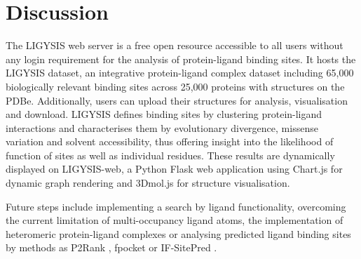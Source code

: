 \section{Discussion}

The LIGYSIS web server is a free open resource accessible to all users without any login requirement for the analysis of protein-ligand binding sites. It hosts the LIGYSIS dataset, an integrative protein-ligand complex dataset including 65,000 biologically relevant binding sites across 25,000 proteins with structures on the PDBe. Additionally, users can upload their structures for analysis, visualisation and download. LIGYSIS defines binding sites by clustering protein-ligand interactions and characterises them by evolutionary divergence, missense variation and solvent accessibility, thus offering insight into the likelihood of function of sites as well as individual residues. These results are dynamically displayed on LIGYSIS-web, a Python Flask web application using Chart.js for dynamic graph rendering and 3Dmol.js for structure visualisation.

Future steps include implementing a search by ligand functionality, overcoming the current limitation of multi-occupancy ligand atoms, the implementation of heteromeric protein-ligand complexes or analysing predicted ligand binding sites by methods as P2Rank \cite{KRIVAK_2015_PRANK, KRIVAK_2015_P2RANK, KRIVAK_2018_P2RANK, JENDELE_2019_PRANKWEB, JAKUBEC_2022_PRANKWEB}, fpocket \cite{GUILLOUX_2009_FPOCKET, SCHMIDTKE_2010_FPOCKET2} or IF-SitePred \cite{CARBERY_2024_IFSP}.
